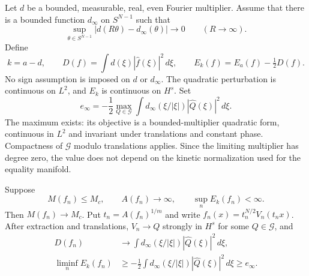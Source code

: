 Let $d$ be a bounded, measurable, real, even Fourier multiplier. Assume
that there is a bounded function $d_\infty$ on $S^{N-1}$ such that
\begin{equation}\label{eq:r11-angular-limit}
 \sup_{\theta\in S^{N-1}}|d(R\theta)-d_\infty(\theta)|
       \longrightarrow0\qquad(R\longrightarrow\infty).
\end{equation}
Define
\[
 k=a-d,\qquad
 D(f)=\int d(\xi)|\widehat f(\xi)|^2\,d\xi,\qquad
 E_k(f)=E_a(f)-\tfrac12D(f).
\]
No sign assumption is imposed on $d$ or $d_\infty$.  The quadratic
perturbation is continuous on $L^2$, and $E_k$ is continuous on $H^s$.
Set
\begin{equation}\label{eq:r11-concentration-energy}
 e_\infty=-\frac12\max_{Q\in\mathcal G}
       \int d_\infty(\xi/|\xi|)|\widehat Q(\xi)|^2\,d\xi.
\end{equation}
The maximum exists: its objective is a bounded-multiplier quadratic
form, continuous in $L^2$ and invariant under translations and constant
phase.  Compactness of $\mathcal G$ modulo translations applies.  Since
the limiting multiplier has degree zero, the value does not depend on
the kinetic normalization used for the equality manifold.

\begin{theorem}
\label{thm:r11-concentrating-sequence}
Suppose
\[
 M(f_n)\le M_c,\qquad A(f_n)\longrightarrow\infty,\qquad
 \sup_n E_k(f_n)<\infty.
\]
Then $M(f_n)\to M_c$.  Put $t_n=A(f_n)^{1/m}$ and write
$f_n(x)=t_n^{N/2}V_n(t_nx)$.  After extraction and translations,
$V_n\to Q$ strongly in $H^s$ for some $Q\in\mathcal G$, and
\begin{align}
 D(f_n)&\longrightarrow
   \int d_\infty(\xi/|\xi|)|\widehat Q(\xi)|^2\,d\xi,
       \label{eq:r11-deficit-limit}\\
 \liminf_n E_k(f_n)&\ge
   -\frac12\int d_\infty(\xi/|\xi|)|\widehat Q(\xi)|^2\,d\xi
   \ge e_\infty.
       \label{eq:r11-concentrating-liminf}
\end{align}
\end{theorem}

